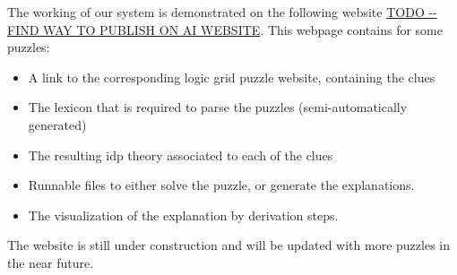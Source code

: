 The working of our system is demonstrated on the following website \url{TODO -- FIND WAY TO PUBLISH ON AI WEBSITE}. This webpage contains for some puzzles: 
\begin{itemize}
 \item A link to the corresponding logic grid puzzle website, containing the clues
 \item The lexicon that is required to parse the puzzles (semi-automatically generated)
 \item The resulting idp theory associated to each of the clues
 \item Runnable \idp files to either solve the puzzle, or generate the explanations. 
 \item The visualization of the explanation by derivation steps. 
\end{itemize}
The website is still under construction and will be updated with more puzzles in the near future. 
